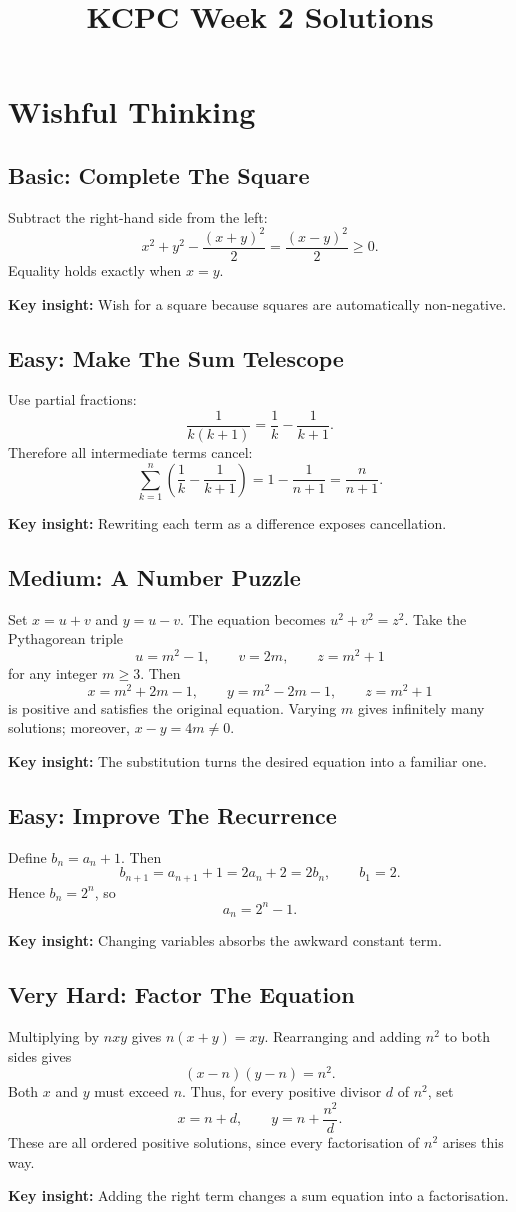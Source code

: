 \documentclass[12pt]{article}
\title{KCPC Week 2 Solutions}
\author{}
\date{}
\newcommand{\insight}[1]{\par\medskip\noindent\textbf{Key insight:} #1}
\begin{document}
\maketitle
\thispagestyle{fancy}

\section{Wishful Thinking}

\subsection*{Basic: Complete The Square}
Subtract the right-hand side from the left:
\[
x^2+y^2-\frac{(x+y)^2}{2}=\frac{(x-y)^2}{2}\ge0.
\]
Equality holds exactly when $x=y$.
\insight{Wish for a square because squares are automatically non-negative.}

\subsection*{Easy: Make The Sum Telescope}
Use partial fractions:
\[
\frac1{k(k+1)}=\frac1k-\frac1{k+1}.
\]
Therefore all intermediate terms cancel:
\[
\sum_{k=1}^{n}\left(\frac1k-\frac1{k+1}\right)
=1-\frac1{n+1}=\frac n{n+1}.
\]
\insight{Rewriting each term as a difference exposes cancellation.}

\subsection*{Medium: A Number Puzzle}
Set $x=u+v$ and $y=u-v$. The equation becomes
$u^2+v^2=z^2$. Take the Pythagorean triple
\[
u=m^2-1,\qquad v=2m,\qquad z=m^2+1
\]
for any integer $m\ge3$. Then
\[
x=m^2+2m-1,\qquad y=m^2-2m-1,\qquad z=m^2+1
\]
is positive and satisfies the original equation. Varying $m$ gives
infinitely many solutions; moreover, $x-y=4m\ne0$.
\insight{The substitution turns the desired equation into a familiar one.}

\subsection*{Easy: Improve The Recurrence}
Define $b_n=a_n+1$. Then
\[
b_{n+1}=a_{n+1}+1=2a_n+2=2b_n,
\qquad b_1=2.
\]
Hence $b_n=2^n$, so
\[
a_n=2^n-1.
\]
\insight{Changing variables absorbs the awkward constant term.}

\subsection*{Very Hard: Factor The Equation}
Multiplying by $nxy$ gives $n(x+y)=xy$. Rearranging and adding $n^2$
to both sides gives
\[
(x-n)(y-n)=n^2.
\]
Both $x$ and $y$ must exceed $n$. Thus, for every positive divisor
$d$ of $n^2$, set
\[
x=n+d,\qquad y=n+\frac{n^2}{d}.
\]
These are all ordered positive solutions, since every factorisation
of $n^2$ arises this way.
\insight{Adding the right term changes a sum equation into a factorisation.}
\end{document}

